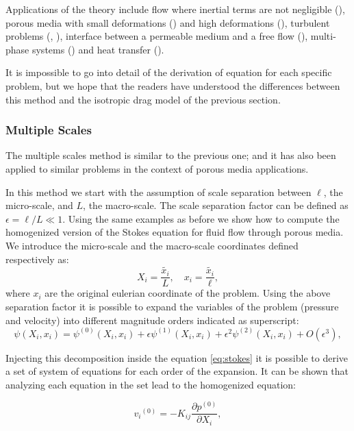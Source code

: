 Applications of the theory include flow where inertial terms are not negligible (\citet{whitaker1996forchheimer}), porous media with small deformations (\citet{whitaker1986flow2}) and high deformations (\citet{hussong2011continuum}), turbulent problems (\citet{soulaine2014}, \citet{breugem2006influence}), interface between a permeable medium and a free flow (\citet{beavers1967boundary}), multi-phase systems (\citet{whitaker1973transport}) and heat transfer (\citet{carbonell1984heat}).

It is impossible to go into detail of the derivation of equation for each specific problem, but we hope that the readers have understood the differences between this method and the isotropic drag model of the previous section.

\subsubsection{Multiple Scales}

The multiple scales method is similar to the previous one; and it has also been applied to similar problems in the context of porous media applications.

In this method we start with the assumption of scale separation between $\ell$, the micro-scale, and $L$, the macro-scale.
The scale separation factor can be defined as $\epsilon = \ell/L \ll 1$.
Using the same examples as before we show how to compute the homogenized version of the Stokes equation for fluid flow through porous media.
We introduce the micro-scale and the macro-scale coordinates defined respectively as:
$$
 X_i = \dfrac{\tilde{x_i}}{L}, \quad   x_i = \dfrac{\tilde{x_i}}{\ell},
$$
where $x_i$ are the original eulerian coordinate of the problem.
Using the above separation factor it is possible to expand the variables of the problem (pressure and velocity) into different magnitude orders indicated as superscript:
$$
\psi(X_i, x_i) = \psi^{(0)}(X_i, x_i)  +\epsilon \psi^{(1)}(X_i, x_i) +\epsilon^2 \psi^{(2)}(X_i, x_i) +O(\epsilon^3),
$$

Injecting this decomposition inside the equation \eqref{eq:stokes} it is possible to derive a set of system of equations for each order of the expansion.
It can be shown that analyzing each equation in the set lead to the homogenized equation:

\begin{equation}
{v_i}^{(0)} = -K_{ij} \dfrac{\partial p^{(0)}}{\partial X_i},
\label{eq:darcy_ms}
\end{equation} 

